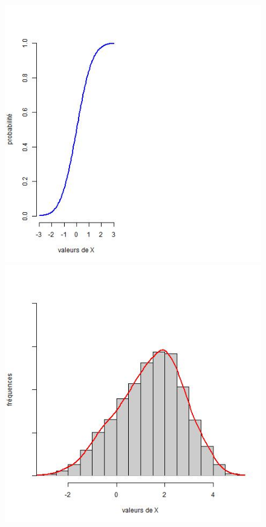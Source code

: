 \begin{figure}[h!] %
	\centering
	\hspace{-1.5cm}
	\begin{minipage}[c]{.46\linewidth}
       \includegraphics[scale=0.4]{figures/concepts/chapitre1-fig1-1.jpeg}
			\end{minipage} \hspace{-0.75cm}
   \begin{minipage}[c]{.46\linewidth}
			\includegraphics[scale=0.4]{figures/concepts/chapitre1-fig1-2.jpeg}

\end{minipage}
\end{figure}
